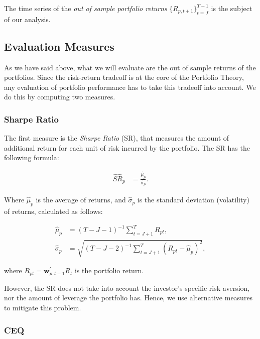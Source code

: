 \documentclass[12pt,oneside,a4paper]{memoir}
\begin{document}
\noindent
The time series of the \textit{out of sample portfolio returns} $\{R_{p,t+1}\}_{t=J}^{T-1}$ is the subject of our analysis. 

\subsection{Evaluation Measures} %

As we have said above, what we will evaluate are the out of sample returns of the portfolios. Since the risk-return tradeoff is at the core of the Portfolio Theory, any evaluation of portfolio performance has to take this tradeoff into account. We do this by computing two measures.

\subsubsection{Sharpe Ratio} 

The first measure is the \textit{Sharpe Ratio} (SR), that measures the amount of additional return for each unit of risk incurred by the portfolio. The SR has the following formula:

\vspace{-12pt}
\begin{align} \label{SR}
	\hat{SR}_p &= \frac{\hat{\mu}_{p}}{\hat{\sigma}_{p}}.
\end{align}

\noindent
Where $\hat{\mu}_{p}$ is the average of returns, and $\hat{\sigma}_{p}$ is the standard deviation (volatility) of returns, calculated as follows:

\vspace{-12pt}
\begin{align}
\hat{\mu}_{p} &= (T-J-1)^{-1}\sum_{t=J+1}^{T}R_{pt},
\\
\hat{\sigma}_{p} &= \sqrt{(T-J-2)^{-1}\sum_{t=J+1}^{T}(R_{pt} - \hat{\mu}_{p})^2},
\end{align}

\noindent
where $R_{pt}=\mathbf{w}^{\prime}_{p,t-1}R_{t}$ is the portfolio return.

However, the SR does not take into account the investor's specific risk aversion, nor the amount of leverage the portfolio has.  Hence, we use alternative measures to mitigate this problem.

\subsubsection{CEQ} 
\end{document}
